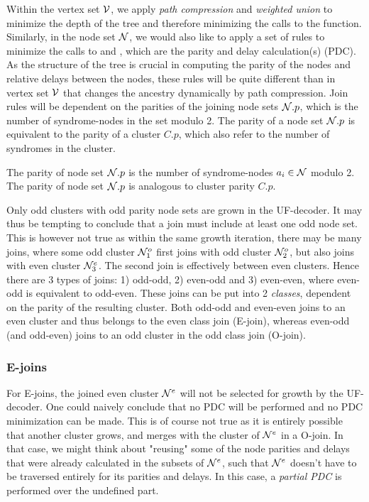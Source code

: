 Within the vertex set $\mathcal{V}$, we apply \emph{path compression} and \emph{weighted union} to minimize the depth of the tree and therefore minimizing the calls to the  function. Similarly, in the node set $\mathcal{N}$, we would also like to apply a set of rules to minimize the calls to  and , which are the parity and delay calculation(s) (PDC). As the structure of the tree is crucial in computing the parity of the nodes and relative delays between the nodes, these rules will be quite different than in vertex set $\mathcal{V}$ that changes the ancestry dynamically by path compression. Join rules will be dependent on the parities of the joining node sets $\mathcal{N}.p$, which is the number of syndrome-nodes in the set modulo 2. The parity of a node set $\mathcal{N}.p$ is equivalent to the parity of a cluster $C.p$, which also refer to the number of syndromes in the cluster.
\begin{lemma}
  The parity of node set $\mathcal{N}.p$ is the number of syndrome-nodes $a_i \in \mathcal{N}$ modulo 2. The parity of node set $\mathcal{N}.p$ is analogous to cluster parity $C.p$.
\end{lemma}

Only odd clusters with odd parity node sets are grown in the UF-decoder. It may thus be tempting to conclude that a join must include at least one odd node set. This is however not true as within the same growth iteration, there may be many joins, where some odd cluster $\mathcal{N}_1^o$ first joins with odd cluster $\mathcal{N}_2^o$, but also joins with even cluster $\mathcal{N}_3^e$. The second join is effectively between even clusters. Hence there are 3 types of joins: 1) odd-odd, 2) even-odd and 3) even-even, where even-odd is equivalent to odd-even. These joins can be put into 2 \emph{classes}, dependent on the parity of the resulting cluster. Both odd-odd and even-even joins to an even cluster and thus belongs to the even class join (E-join), whereas even-odd (and odd-even) joins to an odd cluster in the odd class join (O-join).


\subsubsection{E-joins}

For E-joins, the joined even cluster $\mathcal{N}^e$ will not be selected for growth by the UF-decoder. One could naively conclude that no PDC will be performed and no PDC minimization can be made. This is of course not true as it is entirely possible that another cluster grows, and merges with the cluster of $\mathcal{N}^{e}$ in a O-join. In that case, we might think about "reusing" some of the node parities and delays that were already calculated in the subsets of $\mathcal{N}^e$, such that $\mathcal{N}^{e}$ doesn't have to be traversed entirely for its parities and delays. In this case, a \emph{partial PDC} is performed over the undefined part.

